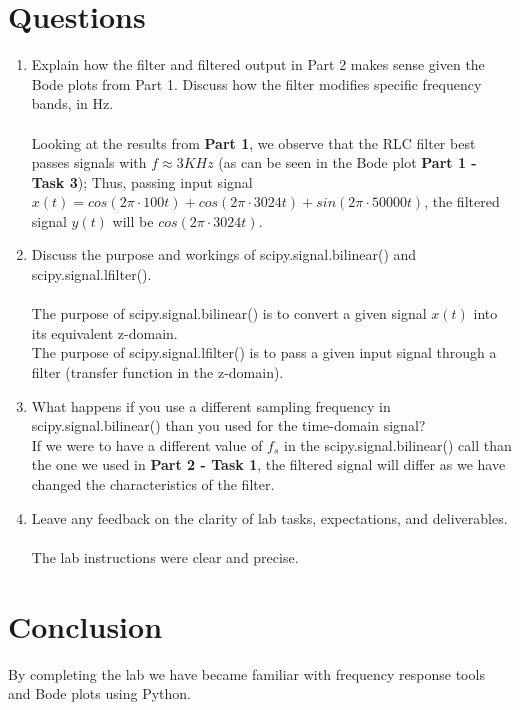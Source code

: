 \documentclass[12pt,a4paper]{article}
\begin{document}
\section{Questions}\label{sec:res}
\begin{enumerate}
    \item Explain how the filter and filtered output in Part 2 makes sense given the Bode plots from Part 1. Discuss how the filter modifies specific frequency bands, in Hz.\\

    \\Looking at the results from \textbf{Part 1}, we observe that the RLC filter best passes signals with $f \approx 3K Hz$ (as can be seen in the Bode plot \textbf{Part 1 - Task 3}); Thus, passing input signal $x(t) = cos(2\pi \cdot 100t) + cos(2\pi \cdot 3024t) + sin(2\pi \cdot 50000t)$, the filtered signal $y(t)$ will be $cos(2\pi \cdot 3024t)$.\\

    \item  Discuss the purpose and workings of scipy.signal.bilinear() and scipy.signal.lfilter().\\
    
    \\The purpose of scipy.signal.bilinear() is to convert a given signal $x(t)$ into its equivalent z-domain.\\
    
    The purpose of scipy.signal.lfilter() is to pass a given input signal through a filter (transfer function in the z-domain).\\
    
    \item  What happens if you use a different sampling frequency in scipy.signal.bilinear() than you used for the time-domain signal?\\
    
    If we were to have a different value of $f_s$ in the scipy.signal.bilinear() call than the one we used in \textbf{Part 2 - Task 1}, the filtered signal will differ as we have changed the characteristics of the filter.\\
    
    \item Leave any feedback on the clarity of lab tasks, expectations, and deliverables.\\
    \\The lab instructions were clear and precise.
\end{enumerate}

\section{Conclusion}\label{sec:res}
    
    By completing the lab we have became familiar with frequency response tools and Bode plots using Python.
 


\end{document}
